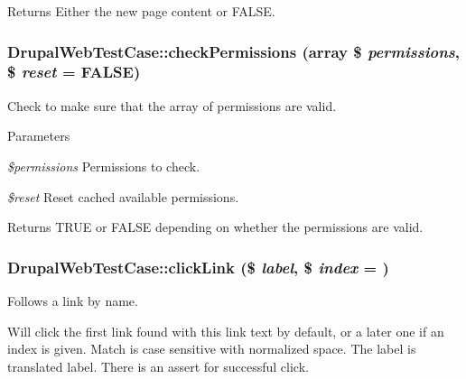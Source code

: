\begin{DoxyReturn}{Returns}
Either the new page content or FALSE. 
\end{DoxyReturn}
\hypertarget{classDrupalWebTestCase_a12e53962cb95e9f6eb86efcc09b08615}{
\subsubsection[{checkPermissions}]{\setlength{\rightskip}{0pt plus 5cm}DrupalWebTestCase::checkPermissions (array \$ {\em permissions}, \/  \$ {\em reset} = {\ttfamily FALSE})}}
\label{classDrupalWebTestCase_a12e53962cb95e9f6eb86efcc09b08615}
Check to make sure that the array of permissions are valid.


\begin{DoxyParams}{Parameters}
\item[{\em \$permissions}]Permissions to check. \item[{\em \$reset}]Reset cached available permissions. \end{DoxyParams}
\begin{DoxyReturn}{Returns}
TRUE or FALSE depending on whether the permissions are valid. 
\end{DoxyReturn}
\hypertarget{classDrupalWebTestCase_a716c6eef22f216695376ea5b531ce9a1}{
\subsubsection[{clickLink}]{\setlength{\rightskip}{0pt plus 5cm}DrupalWebTestCase::clickLink (\$ {\em label}, \/  \$ {\em index} = {})}}
\label{classDrupalWebTestCase_a716c6eef22f216695376ea5b531ce9a1}
Follows a link by name.

Will click the first link found with this link text by default, or a later one if an index is given. Match is case sensitive with normalized space. The label is translated label. There is an assert for successful click.


